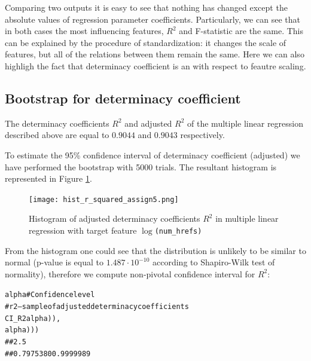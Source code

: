 Comparing two outputs it is easy to see that nothing has changed except the absolute values of regression parameter  coefficients.
Particularly, we can see that in both cases the most influencing features, $R^2$ and F-statistic are the same.  This can be explained by the procedure of standardization: it changes the scale of features, but all of the relations between them remain the same.  Here we can also highligh the fact that determinacy coefficient is an with respect to feautre scaling.

\subsection{Bootstrap for determinacy coefficient}
The determinacy coefficients $R^2$ and adjusted $R^2$ of the multiple linear regression described above  are equal to $0.9044$ and $0.9043$ respectively. 

To estimate the 95\%  confidence interval of determinacy coefficient (adjusted) we have performed  the bootstrap  with 5000 trials. The resultant histogram is represented in Figure \ref{fig:hist_r_squared_bootstrap_assign5}. 

\begin{figure}[h!]
 \begin{center}
    \center \texttt{[image: hist\_r\_squared\_assign5.png]}
   \caption{Histogram of adjusted determinacy coefficients $R^2$ in multiple linear regression with target feature \texttt{$\log$(num\_hrefs)}}
   \label{fig:hist_r_squared_bootstrap_assign5}
 \end{center}
\end{figure} 

From the histogram one could see that the distribution is unlikely to be similar to normal (p-value is equal to $ 1.487\cdot 10^{-10} $ according to Shapiro-Wilk test of normality), therefore we compute non-pivotal confidence interval for $R^2$:
\begin{knitrout}
\color{fgcolor}\begin{kframe}
\begin{alltt}
alpha \hlkwb{<-}  # Confidence level
# r2 --- sample of adjusted determinacy coefficients
CI_R2 \hlkwb{<-} \hlstd{(}\hlstd{ = (} \hlopt{-} alpha)\hlopt{/}), 
            \hlstd{= (} \hlopt{+} alpha)\hlopt{/}))
##      2.5%
## 0.7975380 0.9999989 
\end{alltt}
\end{kframe}
\end{knitrout}

